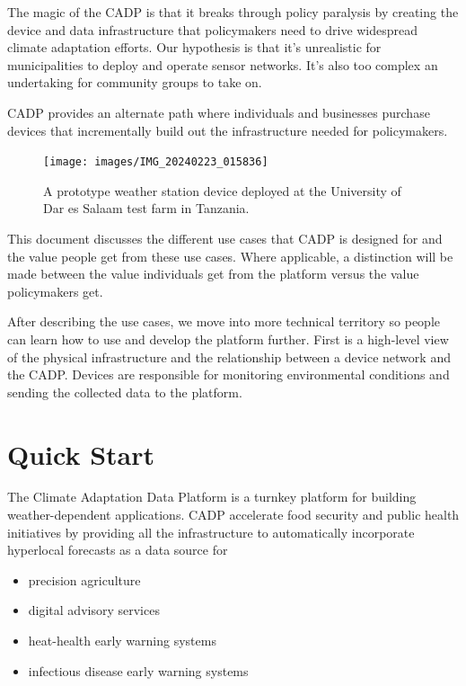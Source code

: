 \documentclass[
]{book}
\providecommand{\tightlist}{%
  \setlength{\itemsep}{0pt}\setlength{\parskip}{0pt}}
\begin{document}
The magic of the CADP is that it breaks through policy paralysis by
creating the device and data infrastructure that policymakers need to
drive widespread climate adaptation efforts.
Our hypothesis is that it's unrealistic for municipalities to deploy
and operate sensor networks.
It's also too complex an undertaking for community groups to take on.

CADP provides an alternate path where individuals and businesses purchase
devices that incrementally build out the infrastructure needed for
policymakers.

\begin{figure}

{\centering \texttt{[image: images/IMG\_20240223\_015836]} 

}

\caption{A prototype weather station device deployed at the University of Dar es Salaam test farm in Tanzania.}\label{fig:unnamed-chunk-2}
\end{figure}

This document discusses the different use cases that CADP is designed for
and the value people get from these use cases.
Where applicable, a distinction will be made between
the value individuals get from the platform versus the value policymakers get.

After describing the use cases, we move into more technical territory
so people can learn how to use and develop the platform further.
First is a high-level view of the physical infrastructure and
the relationship between a device network and the CADP.
Devices are responsible for monitoring environmental conditions
and sending the collected data to the platform.

\hypertarget{quick-start}{%
\chapter{Quick Start}\label{quick-start}}

The Climate Adaptation Data Platform is a turnkey platform for building
weather-dependent applications. CADP accelerate food security and public health
initiatives by providing all the infrastructure to automatically incorporate
hyperlocal forecasts as a data source for

\begin{itemize}
\tightlist
\item
  precision agriculture
\item
  digital advisory services
\item
  heat-health early warning systems
\item
  infectious disease early warning systems
\end{itemize}
\end{document}
